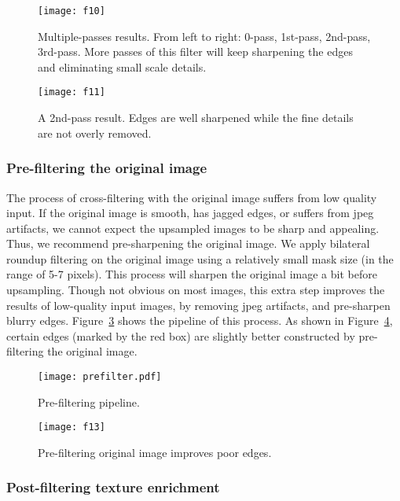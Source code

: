 \begin{figure}[htbp]
\texttt{[image: f10]}
\caption{Multiple-passes results. From left to right: 0-pass, 1st-pass, 2nd-pass, 3rd-pass. More passes of this filter will keep sharpening the edges and eliminating small scale details. }
\label{fig:multipass}
\end{figure}

\begin{figure}[htbp]
\texttt{[image: f11]}
\caption{A 2nd-pass result. Edges are well sharpened while the fine details are not overly removed.}
\label{fig:2ndPassResult}
\end{figure}

\subsubsection{Pre-filtering the original image}


The process of cross-filtering with the original image suffers from low quality input. If the original image is smooth, has jagged edges, or suffers from jpeg artifacts, we cannot expect the upsampled images to be sharp and appealing. Thus, we recommend pre-sharpening the original image. We apply bilateral roundup filtering on the original image using a relatively small mask size (in the range of 5-7 pixels). This process will sharpen the original image a bit before upsampling. Though not obvious on most images, this extra step improves the results of low-quality input images, by removing jpeg artifacts, and pre-sharpen blurry edges. Figure~\ref{fig:prefiltering} shows the pipeline of this process. As shown in Figure~\ref{fig:pre-filteringResult}, certain edges (marked by the red box) are slightly better constructed by pre-filtering the original image.

\begin{figure}[htbp]
\texttt{[image: prefilter.pdf]}
\caption{Pre-filtering pipeline.}
\label{fig:prefiltering}
\end{figure}

\begin{figure}[htbp]
\texttt{[image: f13]}
\caption{Pre-filtering original image improves poor edges.}
\label{fig:pre-filteringResult}
\end{figure}



\subsubsection{Post-filtering texture enrichment}

